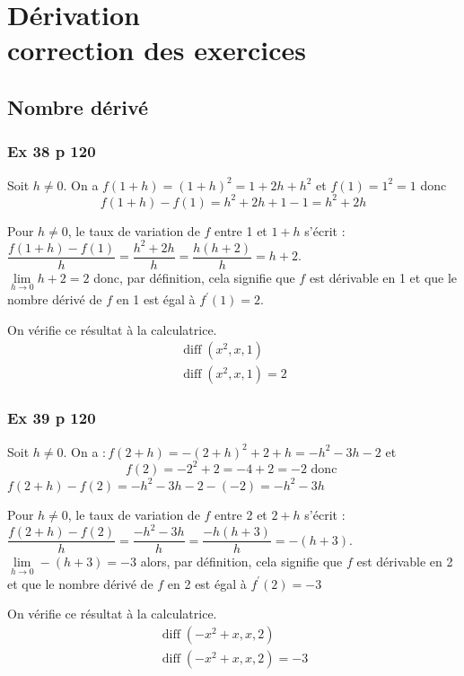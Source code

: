 \documentclass[12pt,a5paper]{book}
\begin{document}
\graphicspath{{images/}}
\setcounter{chapter}{4}
\chapter[Correction des exercices]{Dérivation \\ correction des exercices}
\thispagestyle{fancy}

\section*{Nombre dérivé}

\subsection*{Ex 38 p 120}

\begin{enumMet}
\item Soit $h \neq 0$. On a $f(1+h)=(1+h)^{2}=1+2 h+h^{2}$ et $f(1)=1^{2}=1$ donc
$$
f(1+h)-f(1)=h^{2}+2 h+1-1=h^{2}+2 h
$$
\item Pour $h \neq 0$, le taux de variation de $f$ entre 1 et $1+h$ s'écrit :\\
$\dfrac{f(1+h)-f(1)}{h}=\dfrac{h^{2}+2 h}{h}=\dfrac{h(h+2)}{h}=h+2$.\\
$\lim\limits_{h \rightarrow 0} h+2=2$ donc, par définition, cela signifie que $f$ est dérivable en 1 et que le nombre dérivé de $f$ en 1 est égal à $f^{\prime}(1)=2$.
\item On vérifie ce résultat à la calculatrice.
$$
\begin{array}{r}
\operatorname{diff}\left(x^{2}, x, 1\right) \\
\operatorname{diff}\left(x^{2}, x, 1\right) = 2
\end{array}
$$
\end{enumMet}


\subsection*{Ex 39 p 120}

\begin{enumMet}
\item Soit $h \neq 0$. On a $: f(2+h)=-(2+h)^{2}+2+h=-h^{2}-3 h-2$ et
$$
f(2)=-2^{2}+2=-4+2=-2 \text { donc }
$$
$f(2+h)-f(2)=-h^{2}-3 h-2-(-2)=-h^{2}-3 h$
\item Pour $h \neq 0$, le taux de variation de $f$ entre 2 et $2+h$ s'écrit :\\
$\dfrac{f(2+h)-f(2)}{h}=\dfrac{-h^{2}-3 h}{h}=\dfrac{-h(h+3)}{h}=-(h+3)$.\\
$\lim\limits_{h \rightarrow 0} -(h+3)=-3$ alors, par définition, cela signifie que $f$ est dérivable en 2 et que le nombre dérivé de $f$ en 2 est égal à $f^{\prime}(2)=-3$
\item On vérifie ce résultat à la calculatrice.
$$
\begin{array}{r}
\operatorname{diff}\left(-x^{2}+x, x, 2\right) \\
\operatorname{diff}\left(-x^{2}+x, x, 2\right) = -3
\end{array}
$$
\end{enumMet}
\end{document}
